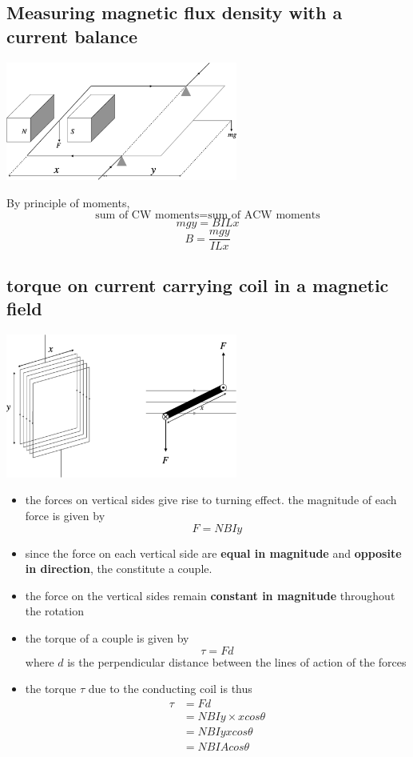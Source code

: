 \documentclass[a4paper, 10pt]{article}
\begin{document}
\subsection{Measuring magnetic flux density with a current balance}
\begin{center}
   \includegraphics[width=3in]{figures/5.pdf} 
\end{center}	

By principle of moments, 
\[
   \text{sum of CW moments} =  \text{sum of ACW moments}
\]
\[
mgy = BILx
\]
\[
B = \frac{mgy}{ILx}
\]

\subsection{torque on current carrying coil in a magnetic field}
\begin{center}
   \includegraphics[width=3in]{figures/6.pdf} 
\end{center}	
\begin{itemize}
   \item the forces on vertical sides give rise to turning effect. the magnitude of each force is given by
      \[
      F = NBIy
      \]
   \item since the force on each vertical side are \textbf{equal in magnitude} and \textbf{opposite in direction}, the constitute a couple.
   \item the force on the vertical sides remain \textbf{constant in magnitude} throughout the rotation
   \item the torque of a couple is given by
      \[
      \tau = Fd
      \]
     where $d$ is the perpendicular distance between the lines of action of the forces
   \item the torque $\tau$ due to the conducting coil is thus
     \begin{align*}
        \tau &= Fd \\
             &= NBIy \times x cos \theta \\
             &= NBIyxcos \theta \\
             &= NBIA cos \theta
     \end{align*}	 
\end{itemize}	
\end{document}
